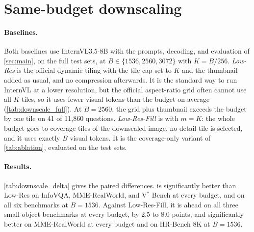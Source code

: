 \section{Same-budget downscaling}
\label{sec:supp_downscale}




\paragraph{Baselines.}
Both baselines use InternVL3.5-8B with the prompts, decoding, and evaluation of \cref{sec:main}, on the full test
sets, at $B\in\{1536,2560,3072\}$ with $K=B/256$. \emph{Low-Res} is the official dynamic tiling with the tile cap
set to $K$ and the thumbnail added as usual, and no compression afterwards. It is the standard way to run InternVL
at a lower resolution, but the official aspect-ratio grid often cannot use all $K$ tiles, so it uses fewer visual
tokens than the budget on average (\cref{tab:downscale_full}). At $B=2560$, the grid plus thumbnail exceeds the
budget by one tile on 41 of 11{,}860 questions. \emph{Low-Res-Fill} is \method with $m=K$: the whole budget goes to
coverage tiles of the downscaled image, no detail tile is selected, and it uses exactly $B$ visual tokens. It is
the coverage-only variant of \cref{tab:ablation}, evaluated on the test sets.

\paragraph{Results.}
\cref{tab:downscale_delta} gives the paired differences. \method is significantly better than Low-Res on InfoVQA,
MME-RealWorld, and V$^*$ Bench at every budget, and on all six benchmarks at $B=1536$. Against Low-Res-Fill, it is
ahead on all three small-object benchmarks at every budget, by 2.5 to 8.0 points, and significantly better on
MME-RealWorld at every budget and on HR-Bench 8K at $B=1536$.
